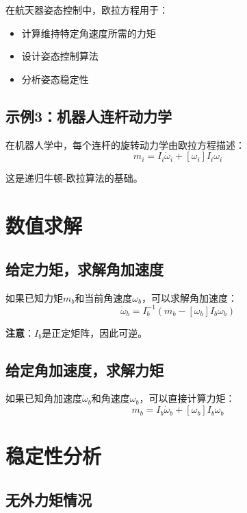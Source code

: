 \documentclass[12pt,a4paper]{article}
\begin{document}
在航天器姿态控制中，欧拉方程用于：
\begin{itemize}
\item 计算维持特定角速度所需的力矩
\item 设计姿态控制算法
\item 分析姿态稳定性
\end{itemize}

\subsection{示例3：机器人连杆动力学}

在机器人学中，每个连杆的旋转动力学由欧拉方程描述：
\begin{equation}
m_i = I_i \dot{\omega}_i + [\omega_i] I_i \omega_i
\end{equation}

这是递归牛顿-欧拉算法的基础。

\section{数值求解}

\subsection{给定力矩，求解角加速度}

如果已知力矩$m_b$和当前角速度$\omega_b$，可以求解角加速度：
\begin{equation}
\dot{\omega}_b = I_b^{-1} (m_b - [\omega_b] I_b \omega_b)
\end{equation}

\textbf{注意}：$I_b$是正定矩阵，因此可逆。

\subsection{给定角加速度，求解力矩}

如果已知角加速度$\dot{\omega}_b$和角速度$\omega_b$，可以直接计算力矩：
\begin{equation}
m_b = I_b \dot{\omega}_b + [\omega_b] I_b \omega_b
\end{equation}

\section{稳定性分析}

\subsection{无外力矩情况}
\end{document}
